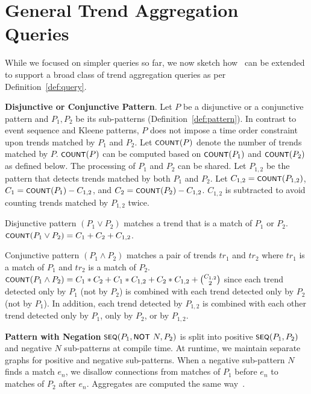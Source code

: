 \section{General Trend Aggregation Queries}
\label{sec:other}

While we focused on simpler queries so far, 
we now sketch how \app\ can be extended to support a broad class of trend aggregation queries as per Definition~\ref{def:query}.

\textbf{Disjunctive or Conjunctive Pattern}.
Let $P$ be a disjunctive or a conjunctive pattern and $P_1, P_2$ be its sub-patterns (Definition~\ref{def:pattern}). In contrast to event sequence and Kleene patterns,
$P$ does not impose a time order constraint upon trends matched by $P_1$ and $P_2$. 
%
Let $\textsf{\footnotesize COUNT}(P)$ denote the number of trends matched by $P$. $\textsf{\footnotesize COUNT}(P)$ can be computed based on $\textsf{\footnotesize COUNT}(P_1)$ and $\textsf{\footnotesize COUNT}(P_2)$ as defined below. The processing of $P_1$ and $P_2$ can be shared. 
%
Let $P_{1,2}$ be the pattern that detects trends matched by both $P_1$ and $P_2$. 
%
%
Let 
$C_{1,2} = \textsf{\footnotesize COUNT}(P_{1,2})$,
$C_1 = \textsf{\footnotesize COUNT}(P_1) - C_{1,2}$, and
$C_2 = \textsf{\footnotesize COUNT}(P_2) - C_{1,2}$.
$C_{1,2}$ is subtracted to avoid counting trends matched by $P_{1,2}$ twice.

Disjunctive pattern $(P_1 \vee P_2)$  matches a trend that is a match of $P_1$ or $P_2$. 
$\textsf{\footnotesize COUNT}(P_1 \vee P_2) = C_1 + C_2 + C_{1,2}$.

Conjunctive pattern $(P_1 \wedge P_2)$  matches a pair of trends $tr_1$ and $tr_2$ where $tr_1$ is a match of $P_1$ and $tr_2$ is a match of $P_2$. 
$\textsf{\footnotesize COUNT}(P_1 \wedge P_2) = 
C_1 * C_2 + 
C_1 * C_{1,2} +
C_2 * C_{1,2} +
\binom{C_{1,2}}{2}$
since each trend detected only by $P_1$ (not by $P_2$) is combined with each trend detected only by $P_2$ (not by $P_1$). In addition, each trend detected by $P_{1,2}$ is combined with each other trend detected only by $P_1$, only by $P_2$, or by $P_{1,2}$.


\textbf{Pattern with Negation} $\textsf{\footnotesize SEQ}(P_1,{\small \textsf{NOT}}\ N, P_2)$ is 
split into positive $\textsf{\footnotesize SEQ}(P_1,P_2)$ and negative $N$ sub-patterns at compile time. At runtime, we maintain separate graphs for positive and negative sub-patterns. When a negative sub-pattern $N$ finds a match $e_n$, we disallow connections from matches of $P_1$ before $e_n$ to matches of $P_2$ after $e_n$. Aggregates are computed the same way~\cite{PLRM18}.

